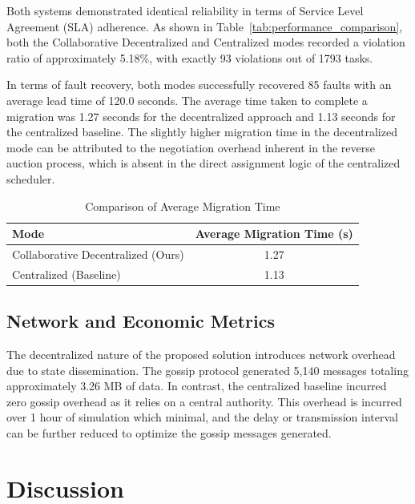 \documentclass{article}
\begin{document}
Both systems demonstrated identical reliability in terms of Service Level Agreement (SLA) adherence. As shown in Table~\ref{tab:performance_comparison}, both the Collaborative Decentralized and Centralized modes recorded a violation ratio of approximately 5.18\%, with exactly 93 violations out of 1793 tasks. 

In terms of fault recovery, both modes successfully recovered 85 faults with an average lead time of 120.0 seconds. The average time taken to complete a migration was 1.27 seconds for the decentralized approach and 1.13 seconds for the centralized baseline. The slightly higher migration time in the decentralized mode can be attributed to the negotiation overhead inherent in the reverse auction process, which is absent in the direct assignment logic of the centralized scheduler.

\begin{table}[h!]
\centering
\caption{Comparison of Average Migration Time}
\label{tab:avg_migration_time}
\begin{tabular}{lc}
\toprule
\textbf{Mode} & \textbf{Average Migration Time (s)} \\ 
\midrule
Collaborative Decentralized (Ours) & 1.27 \\
Centralized (Baseline)             & 1.13 \\
\bottomrule
\end{tabular}
\end{table}

\subsection{Network and Economic Metrics}

The decentralized nature of the proposed solution introduces network overhead due to state dissemination. The gossip protocol generated 5,140 messages totaling approximately 3.26 MB of data. In contrast, the centralized baseline incurred zero gossip overhead as it relies on a central authority. This overhead is incurred over 1 hour of simulation which minimal, and the delay or transmission interval can be  further reduced to optimize the gossip messages generated. 

\section{Discussion} \label{sec:discussion}
\end{document}
